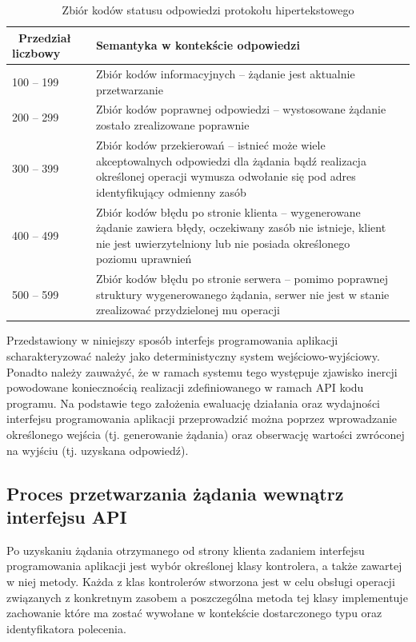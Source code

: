 \begin{table}[htbp] \small
\centering
\caption{Zbiór kodów statusu odpowiedzi protokołu hipertekstowego}
\label{tab:kody-odpowiedzi}
\begin{tabularx}{\linewidth}{|p{4cm}|X|X|} \hline\
Przedział liczbowy & Semantyka w kontekście odpowiedzi\\ \hline\hline
100 -- 199 & Zbiór kodów informacyjnych -- żądanie jest aktualnie przetwarzanie\\ \hline
200 -- 299 & Zbiór kodów poprawnej odpowiedzi -- wystosowane żądanie zostało zrealizowane poprawnie \\ \hline
300 -- 399 & Zbiór kodów przekierowań -- istnieć może wiele akceptowalnych odpowiedzi dla żądania bądź realizacja określonej operacji wymusza odwołanie się pod adres identyfikujący odmienny zasób \\ \hline
400 -- 499 & Zbiór kodów błędu po stronie klienta -- wygenerowane żądanie zawiera błędy, oczekiwany zasób nie istnieje, klient nie jest uwierzytelniony lub nie posiada określonego poziomu uprawnień \\ \hline
500 -- 599 & Zbiór kodów błędu po stronie serwera -- pomimo poprawnej struktury wygenerowanego żądania, serwer nie jest w stanie zrealizować przydzielonej mu operacji\\ \hline
\end{tabularx}
\end{table}

Przedstawiony w niniejszy sposób interfejs programowania aplikacji scharakteryzować należy jako deterministyczny system wejściowo-wyjściowy. Ponadto należy zauważyć, że w ramach systemu tego występuje zjawisko inercji powodowane koniecznością realizacji zdefiniowanego w ramach API kodu programu. Na podstawie tego założenia ewaluację działania oraz wydajności interfejsu programowania aplikacji przeprowadzić można poprzez wprowadzanie określonego wejścia (tj. generowanie żądania) oraz obserwację wartości zwróconej na wyjściu (tj. uzyskana odpowiedź).

\subsection*{Proces przetwarzania żądania wewnątrz interfejsu API}
Po uzyskaniu żądania otrzymanego od strony klienta zadaniem interfejsu programowania aplikacji jest wybór określonej klasy kontrolera, a także zawartej w niej metody. Każda z klas kontrolerów stworzona jest w celu obsługi operacji związanych z konkretnym zasobem a poszczególna metoda tej klasy implementuje zachowanie które ma zostać wywołane w kontekście dostarczonego typu oraz identyfikatora polecenia.

